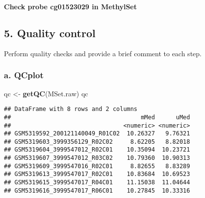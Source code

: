\documentclass[
  11pt,
]{article}
\newenvironment{Shaded}{\begin{snugshade}}{\end{snugshade}}
\newcommand{\FunctionTok}[1]{\textcolor[rgb]{0.13,0.29,0.53}{\textbf{#1}}}
\newcommand{\NormalTok}[1]{#1}
\newcommand{\OtherTok}[1]{\textcolor[rgb]{0.56,0.35,0.01}{#1}}
\newcommand{\SpecialCharTok}[1]{\textcolor[rgb]{0.81,0.36,0.00}{\textbf{#1}}}
\newcommand{\StringTok}[1]{\textcolor[rgb]{0.31,0.60,0.02}{#1}}
\begin{document}
\textbf{Check probe cg01523029 in MethylSet}

\begin{Shaded}
\end{Shaded}

\subsection{5. Quality control}\label{quality-control}

Perform quality checks and provide a brief comment to each step.

\subsubsection{a. QCplot}\label{a.-qcplot}

\begin{Shaded}
\begin{Highlighting}[]
\NormalTok{qc }\OtherTok{\textless{}{-}} \FunctionTok{getQC}\NormalTok{(MSet.raw)}
\NormalTok{qc}
\end{Highlighting}
\end{Shaded}

\begin{verbatim}
## DataFrame with 8 rows and 2 columns
##                                     mMed      uMed
##                                <numeric> <numeric>
## GSM5319592_200121140049_R01C02  10.26327   9.76321
## GSM5319603_3999356129_R02C02     8.62205   8.82018
## GSM5319604_3999547012_R02C01    10.35094  10.23721
## GSM5319607_3999547012_R03C02    10.79360  10.90313
## GSM5319609_3999547016_R02C01     8.82655   8.83289
## GSM5319613_3999547017_R02C01    10.83684  10.69523
## GSM5319615_3999547017_R04C01    11.15038  11.04644
## GSM5319616_3999547017_R06C01    10.27845  10.33316
\end{verbatim}
\end{document}
